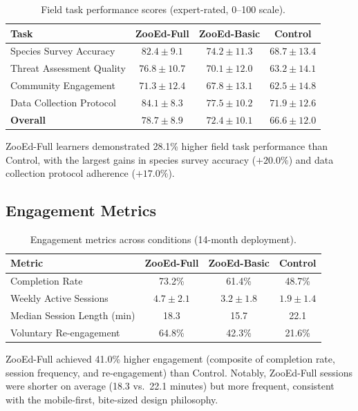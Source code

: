 \begin{table}[H]
\centering
\caption{Field task performance scores (expert-rated, 0--100 scale).}
\label{tab:transfer}
\begin{tabular}{@{}lccc@{}}
\toprule
\textbf{Task} & \textbf{ZooEd-Full} & \textbf{ZooEd-Basic} & \textbf{Control} \\
\midrule
Species Survey Accuracy & $82.4 \pm 9.1$ & $74.2 \pm 11.3$ & $68.7 \pm 13.4$ \\
Threat Assessment Quality & $76.8 \pm 10.7$ & $70.1 \pm 12.0$ & $63.2 \pm 14.1$ \\
Community Engagement & $71.3 \pm 12.4$ & $67.8 \pm 13.1$ & $62.5 \pm 14.8$ \\
Data Collection Protocol & $84.1 \pm 8.3$ & $77.5 \pm 10.2$ & $71.9 \pm 12.6$ \\
\midrule
\textbf{Overall} & $\mathbf{78.7 \pm 8.9}$ & $72.4 \pm 10.1$ & $66.6 \pm 12.0$ \\
\bottomrule
\end{tabular}
\end{table}

ZooEd-Full learners demonstrated 28.1\% higher field task performance than Control, with the largest gains in species survey accuracy ($+20.0\%$) and data collection protocol adherence ($+17.0\%$).

\subsection{Engagement Metrics}

\begin{table}[H]
\centering
\caption{Engagement metrics across conditions (14-month deployment).}
\label{tab:engagement}
\begin{tabular}{@{}lccc@{}}
\toprule
\textbf{Metric} & \textbf{ZooEd-Full} & \textbf{ZooEd-Basic} & \textbf{Control} \\
\midrule
Completion Rate & 73.2\% & 61.4\% & 48.7\% \\
Weekly Active Sessions & $4.7 \pm 2.1$ & $3.2 \pm 1.8$ & $1.9 \pm 1.4$ \\
Median Session Length (min) & 18.3 & 15.7 & 22.1 \\
Voluntary Re-engagement & 64.8\% & 42.3\% & 21.6\% \\
\bottomrule
\end{tabular}
\end{table}

ZooEd-Full achieved 41.0\% higher engagement (composite of completion rate, session frequency, and re-engagement) than Control.
Notably, ZooEd-Full sessions were shorter on average (18.3 vs.\ 22.1 minutes) but more frequent, consistent with the mobile-first, bite-sized design philosophy.


